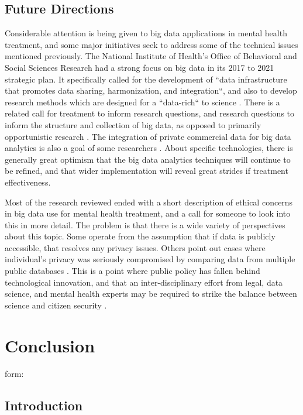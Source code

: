 \documentclass[sigconf]{acmart}
\begin{document}
\subsection{Future Directions}
Considerable attention is being given to big data applications in mental health treatment, and some major initiatives seek to address some of the technical issues mentioned previously. The National Institute of Health's Office of Behavioral and Social Sciences Research had a strong focus on big data in its 2017 to 2021 strategic plan. It specifically called for the development of ``data infrastructure that promotes data sharing, harmonization, and integration``, and also to develop research methods which are designed for a ``data-rich`` to science \cite{nihstrategy}. There is a related call for treatment to inform research questions, and research questions to inform the structure and collection of big data, as opposed to primarily opportunistic research \cite{bdmhtxfuture}.  The integration of private commercial data for big data analytics is also a goal of some researchers \cite{bdfragment}. About specific technologies, there is generally great optimism that the big data analytics techniques will continue to be refined, and that wider implementation will reveal great strides if treatment effectiveness.  

Most of the research reviewed ended with a short description of ethical concerns in big data use for mental health treatment, and a call for someone to look into this in more detail. The problem is that there is a wide variety of perspectives about this topic. Some operate from the assumption that if data is publicly accessible, that resolves any privacy issues. Others point out cases where individual's privacy was seriously compromised by comparing data from multiple public databases \cite{ethicsdivide}. This is a point where public policy has fallen behind technological innovation, and that an inter-disciplinary effort from legal, data science, and mental health experts may be required to strike the balance between science and citizen security \cite{datalaw}.

\section{Conclusion}

\appendix

form:

\subsection{Introduction}
\end{document}
